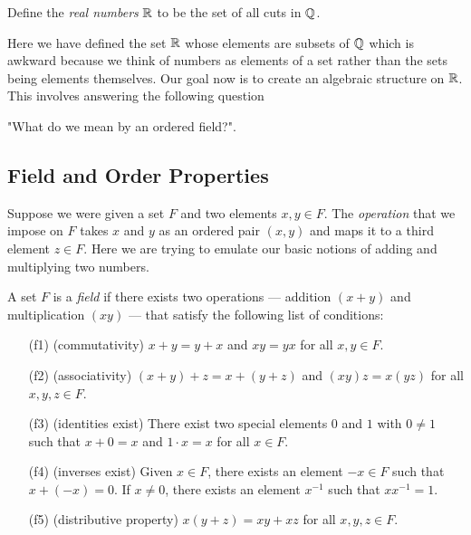 \begin{definition}{}{}
    Define the \textit{real numbers} \( \mathbb{R}  \) to be the set of all cuts in \( \mathbb{Q}  \).
\end{definition}

Here we have defined the set \( \mathbb{R}  \) whose elements are subsets of \( \mathbb{Q}  \) which is awkward because we think of numbers as elements of a set rather than the sets being elements themselves. Our goal now is to create an algebraic structure on \( \mathbb{R}  \). This involves answering the following question
\begin{center}
    "What do we mean by an ordered field?".
\end{center}

\subsection{Field and Order Properties}

Suppose we were given a set \( F  \) and two elements \( x ,y \in F  \). The \textit{operation} that we impose on \( F  \) takes \( x  \) and \( y  \) as an ordered pair \( (x,y)  \) and maps it to a third element \( z \in F  \). Here we are trying to emulate our basic notions of adding and multiplying two numbers.

\begin{definition}[Field]   A set \( F  \) is a \textit{field} if there exists two operations --- addition \( (x+y)  \) and multiplication \( (xy) \) --- that satisfy the following list of conditions:
   \begin{enumerate}
       \item[(f1)] (commutativity) \( x + y = y + x  \) and \( xy = yx  \) for all \( x,y \in F  \).
       \item[(f2)] (associativity) \( (x+y) + z = x + (y+z)  \) and \( (xy)z = x(yz)    \) for all \( x,y,z \in F  \).
        \item[(f3)] (identities exist) There exist two special elements \( 0  \) and \( 1  \) with \(  0 \neq 1  \) such that \( x + 0 = x  \) and \( 1 \cdot x = x  \) for all \( x \in F  \).
        \item[(f4)] (inverses exist) Given \( x \in F  \), there exists an element \( -x \in F  \) such that \( x + (-x) = 0  \). If \( x \neq 0  \), there exists an element \( x^{-1} \) such that \(  x x^{-1} = 1  \).
        \item[(f5)] (distributive property) \( x(y+z) = xy + xz \) for all \( x,y,z \in F  \).
   \end{enumerate}
\end{definition}

